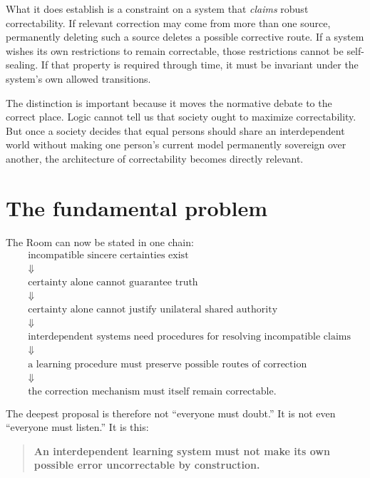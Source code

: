 \documentclass[11pt,a4paper]{article}
\begin{document}
What it does establish is a constraint on a system that \emph{claims} robust correctability. If relevant correction may come from more than one source, permanently deleting such a source deletes a possible corrective route. If a system wishes its own restrictions to remain correctable, those restrictions cannot be self-sealing. If that property is required through time, it must be invariant under the system's own allowed transitions.

The distinction is important because it moves the normative debate to the correct place. Logic cannot tell us that society ought to maximize correctability. But once a society decides that equal persons should share an interdependent world without making one person's current model permanently sovereign over another, the architecture of correctability becomes directly relevant.

\section{The fundamental problem}

The Room can now be stated in one chain:
\[
\begin{aligned}
&\text{incompatible sincere certainties exist}\\
&\Downarrow\\
&\text{certainty alone cannot guarantee truth}\\
&\Downarrow\\
&\text{certainty alone cannot justify unilateral shared authority}\\
&\Downarrow\\
&\text{interdependent systems need procedures for resolving incompatible claims}\\
&\Downarrow\\
&\text{a learning procedure must preserve possible routes of correction}\\
&\Downarrow\\
&\boxed{\text{the correction mechanism must itself remain correctable}.}
\end{aligned}
\]

The deepest proposal is therefore not ``everyone must doubt.'' It is not even ``everyone must listen.'' It is this:

\begin{quote}
\textbf{An interdependent learning system must not make its own possible error uncorrectable by construction.}
\end{quote}
\end{document}

